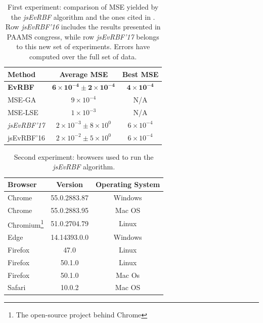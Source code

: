 \documentclass{article}
\begin{document}
\setlength{\tabcolsep}{10pt}
\begin{table}
\caption{First experiment: comparison of MSE yielded by the {\em jsEvRBF} algorithm and the ones cited in \cite{rivas03:EvRBF}. Row {\em jsEvRBF'16} includes the results presented in PAAMS congress, while row {\em jsEvRBF'17} belongs to this new set of experiments. Errors have computed over the full set of data.}
\label{tab:comparison-first-experiment}
\begin{center}
\begin{tabular}{lcc}
{\bf Method} & {\bf Average MSE} & {\bf Best MSE} \\
\hline
\bf EvRBF & $\mathbf{6 \times 10^{-4} \pm 2 \times 10^{-4}}$ &$\mathbf{4 \times 10^{-4}}$ \\
MSE-GA & $9 \times 10^{-4}$ & N/A \\
MSE-LSE &  $1 \times 10^{-3}$ & N/A \\
{\em jsEvRBF'17} & $\mathit{2 \times 10^{-3} \pm 8 \times 10^{0}}$ & $\mathit{6 \times 10^{-4}}$  \\
jsEvRBF'16 & $2 \times 10^{-2} \pm 5 \times 10^{0}$ & $6 \times10^{-4}$  \\
\hline
\end{tabular}
\end{center}
\end{table}

\clearpage









\setlength{\tabcolsep}{10pt}
\begin{table}
\caption{Second experiment: browsers used to run the {\em jsEvRBF} algorithm.}
\label{tab:browsers-second-experiment}
\begin{center}
\begin{tabular}{lcc}
{\bf Browser} & {\bf Version} & {\bf Operating System} \\
\hline
Chrome & 55.0.2883.87 & Windows \\
Chrome & 55.0.2883.95 & Mac OS \\
Chromium\footnote{The open-source project behind Chrome} & 51.0.2704.79 & Linux \\
Edge & 14.14393.0.0 & Windows \\
Firefox & 47.0 & Linux \\
Firefox & 50.1.0 & Linux \\
Firefox & 50.1.0 & Mac Os \\
Safari & 10.0.2 & Mac OS \\
\hline
\end{tabular}
\end{center}
\end{table}
\end{document}
